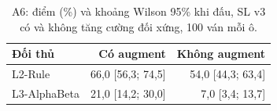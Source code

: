 \begin{table}[H]
  \centering\small
  \caption{A6: điểm (\%) và khoảng Wilson 95\% khi đấu, SL v3 có và không tăng cường đối xứng, 100 ván mỗi ô.}
  \label{tab:a6}
  \setlength{\tabcolsep}{4pt}
  \begin{tabular}{@{}lrr@{}}
    \toprule
    Đối thủ & Có augment & Không augment \\
    \midrule
    L2-Rule & 66{,}0 [56{,}3; 74{,}5] & 54{,}0 [44{,}3; 63{,}4] \\
    L3-AlphaBeta & 21{,}0 [14{,}2; 30{,}0] & 7{,}0 [3{,}4; 13{,}7] \\
    \bottomrule
  \end{tabular}
\end{table}
